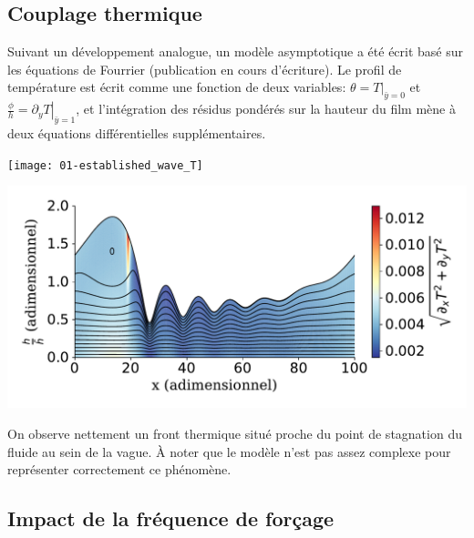 \documentclass[a0,portrait]{a0poster}
\begin{document}
\begin{multicols}{2}
    \subsection*{Couplage thermique}
    Suivant un développement analogue, un modèle asymptotique a été écrit basé sur les équations de Fourrier (publication en cours d'écriture). Le profil de température est écrit comme une fonction de deux variables: $\theta = T|_{\bar{y}=0}$ et $\frac{\phi}{h} = \left.\partial_{y}T\right|_{\bar{y}=1}$, et l'intégration des résidus pondérés sur la hauteur du film mène à deux équations différentielles supplémentaires.

    \begin{multicols}{2}
        \begin{center}
            \texttt{[image: 01-established\_wave\_T]}
            \label{fig:thermal}
        \end{center}
        \columnbreak
        \begin{center}
            \includegraphics[width=0.98\columnwidth]{01-established_wave_Tmag_streamlines}
            \label{fig:streamlines_thermal}
        \end{center}
    \end{multicols}

    On observe nettement un front thermique situé proche du point de stagnation du fluide au sein de la vague. À noter que le modèle n'est pas assez complexe pour représenter correctement ce phénomène.

    \columnbreak

    \subsection*{Impact de la fréquence de forçage}


\end{multicols}
\end{document}
